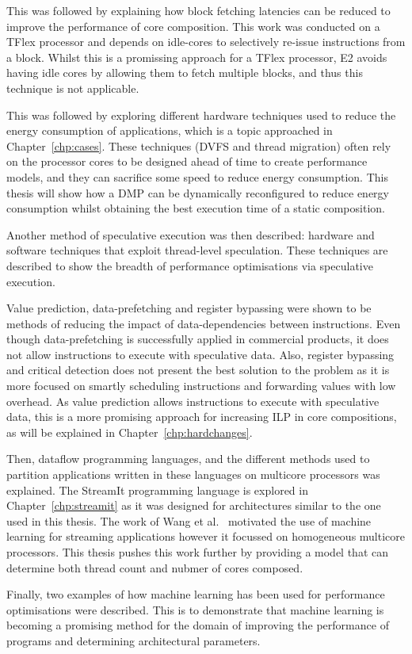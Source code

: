 This was followed by explaining how block fetching latencies can be reduced to improve the performance of core composition.
This work was conducted on a TFlex processor and depends on idle-cores to selectively re-issue instructions from a block.
Whilst this is a promissing approach for a TFlex processor, E2 avoids having idle cores by allowing them to fetch multiple blocks, and thus this technique is not applicable.

This was followed by exploring different hardware techniques used to reduce the energy consumption of applications, which is a topic approached in Chapter~\ref{chp:cases}.
These techniques (DVFS and thread migration) often rely on the processor cores to be designed ahead of time to create performance models, and they can sacrifice some speed to reduce energy consumption.
This thesis will show how a DMP can be dynamically reconfigured to reduce energy consumption whilst obtaining the best execution time of a static composition.

Another method of speculative execution was then described: hardware and software techniques that exploit thread-level speculation.
These techniques are described to show the breadth of performance optimisations via speculative execution.

Value prediction, data-prefetching and register bypassing were shown to be methods of reducing the impact of data-dependencies between instructions.
Even though data-prefetching is successfully applied in commercial products, it does not allow instructions to execute with speculative data.
Also, register bypassing and critical detection does not present the best solution to the problem as it is more focused on smartly scheduling instructions and forwarding values with low overhead.
As value prediction allows instructions to execute with speculative data, this is a more promising approach for increasing ILP in core compositions, as will be explained in Chapter~\ref{chp:hardchanges}.

Then, dataflow programming languages, and the different methods used to partition applications written in these languages on multicore processors was explained.
The StreamIt programming language is explored in Chapter~\ref{chp:streamit} as it was designed for architectures similar to the one used in this thesis.
The work of Wang et al.~\cite{wang2013partitionstreamit} motivated the use of machine learning for streaming applications however it focussed on homogeneous multicore processors.
This thesis pushes this work further by providing a model that can determine both thread count and nubmer of cores composed.

Finally, two examples of how machine learning has been used for performance optimisations were described.
This is to demonstrate that machine learning is becoming a promising method for the domain of improving the performance of programs and determining architectural parameters.
